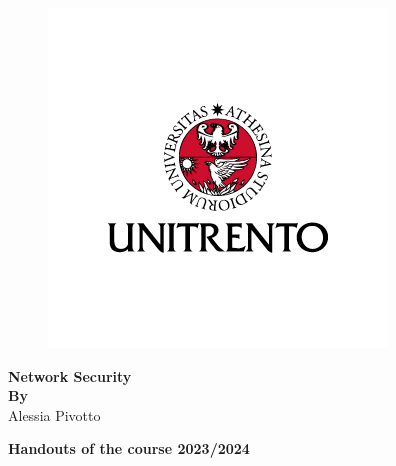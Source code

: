 \begin{titlepage}
   \begin{figure}
          \centering
          \includegraphics[scale=1]{Figures/Logo.png}
      \end{figure}
      \begin{center}
   
          \textbf{\LARGE Network Security}
           \vspace{1.5cm} \\
           
          \textbf{\textbf{By}} \\Alessia Pivotto 
          
   
   \textbf{Handouts of the course 2023/2024}\\      
   \vspace{0.5cm}
           
      \end{center}
   \end{titlepage}
